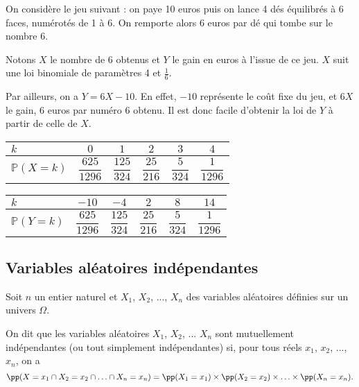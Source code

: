 \documentclass[11pt,fleqn, openany]{book} %
\begin{document}
\begin{example}On considère le jeu suivant : on paye 10 euros puis on lance 4 dés équilibrés à 6 faces, numérotés de 1 à 6. On remporte alors 6 euros par dé qui tombe sur le nombre 6.

Notons $X$ le nombre de 6 obtenus et $Y$ le gain en euros à l'issue de ce jeu. $X$ suit une loi binomiale de paramètres 4 et $\frac{1}{6}$. 

Par ailleurs, on a $Y=6X-10$. En effet, $-10$ représente le coût fixe du jeu, et $6X$ le gain, 6 euros par numéro 6 obtenu. Il est donc facile d'obtenir la loi de $Y$ à partir de celle de $X$.

\begin{minipage}{0.49\linewidth}
\begin{center}
\renewcommand{\arraystretch}{2.2}
\begin{tabular}{|l|c|c|c|c|c|}
\hline
$k$ & $0$& $1$ & $2$  & $3$ & $4$\\
\hline
$\mathbb{P}(X=k)$ & $\dfrac{625}{1296}$ & $\dfrac{125}{324}$ & $\dfrac{25}{216}$ & $\dfrac{5}{324}$ & $\dfrac{1}{1296}$ \\
\hline \end{tabular}
\end{center}

\end{minipage}\hfill\begin{minipage}{0.49\linewidth}
\begin{center}
\renewcommand{\arraystretch}{2.2}
\begin{tabular}{|l|c|c|c|c|c|}
\hline
$k$ & $-10$& $-4$ & $2$  & $8$ & $14$\\
\hline
$\mathbb{P}(Y=k)$ & $\dfrac{625}{1296}$ & $\dfrac{125}{324}$ & $\dfrac{25}{216}$ & $\dfrac{5}{324}$ & $\dfrac{1}{1296}$ \\
\hline \end{tabular}
\end{center}

\end{minipage}
\vspace{-0,1cm}
\end{example}


\subsection{Variables aléatoires indépendantes}

\begin{definition}Soit $n$ un entier naturel et $X_1$, $X_2$, ..., $X_n$ des variables aléatoires définies sur un univers $\Omega$.

On dit que les variables aléatoires $X_1$, $X_2$, ... $X_n$ sont mutuellement indépendantes (ou tout simplement indépendantes) si, pour tous réels $x_1$, $x_2$, ..., $x_n$, on a
\[\pp(X=x_1 \cap X_2=x_2 \cap \ldots \cap X_n=x_n)=\pp(X_1=x_1) \times \pp(X_2=x_2) \times \ldots \times \pp(X_n=x_n).\]\end{definition}
\end{document}
